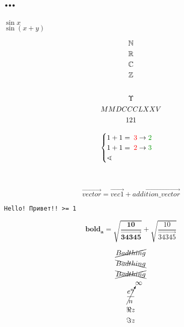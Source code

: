 \documentclass[12pt, a4paper]{article}
\begin{document}
    \section{…}

    $\sin x$\\
    $\sin(x+y)$

    \begin{gather}
        {\mathbb{N}} \\
        {\mathbb{R}} \\
        {\mathbb{C}} \\
        {\mathbb{Z}}
    \end{gather}

    \begin{equation}
        \label{eq:upsilon}
    \end{equation}

    \begin{gather}
        \Upsilon \\
        \RNumb{2875} \\
        \rm 121
    \end{gather}



    \begin{equation}
        \begin{cases}
            1+1=\correction{3}{2} \\
            1+1=\correction{2}{3} \\
            \sphericalangle 
        \end{cases}            
    \end{equation}

    \\



    \begin{equation}    
        \vec{vector} = \vec{vec1} + \vec{addition\_vector}
    \end{equation}    

    \texttt{Hello! Привет!! >= 1}

    \begin{equation}
        \symbf{bold_a = \sqrt{\frac{10}{\vec{34345}}}} + \sqrt{\frac{10}{\vec{34345}}}
    \end{equation}


    \begin{gather}
        \cancel{Bad thing}\\
        \bcancel{Bad thing}\\
        \xcancel{Bad thing}\\    
        \cancelto{\infty}{\frac{e^n}{n}}\\
        \Re z \\
        \Im z 
    \end{gather}
\end{document}
